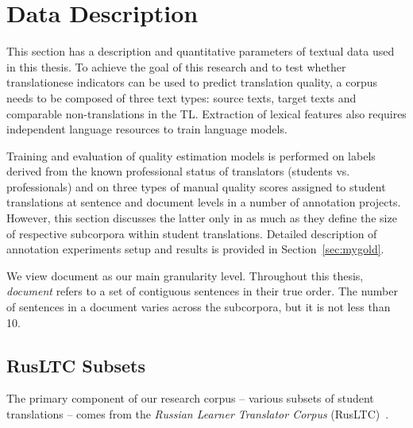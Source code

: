 \section{\label{sec:data}Data Description}
This section has a description and quantitative parameters of textual data used in this thesis. 
To achieve the goal of this research and to test whether translationese indicators can be used to predict translation quality, a corpus needs to be composed of three text types: source texts, target texts and comparable non-translations in the TL. Extraction of lexical features also requires independent language resources to train language models. 

Training and evaluation of quality estimation models is performed on labels derived from the known professional status of translators (students vs. professionals) and on three types of manual quality scores assigned to student translations at sentence and document levels in a number of annotation projects. However, this section discusses the latter only in as much as they define the size of respective subcorpora within student translations. Detailed description of annotation experiments setup and results is provided in Section~\ref{sec:mygold}.

We view document as our main granularity level. Throughout this thesis, \textit{document} refers to a set of contiguous sentences in their true order. The number of sentences in a document varies across the subcorpora, but it is not less than 10.

\subsection{\label{ssec:subsets}RusLTC Subsets}
The primary component of our research corpus -- various subsets of student translations -- comes from the \textit{Russian Learner Translator Corpus} (RusLTC)~\cite{Kutuzov2014rltc}.

